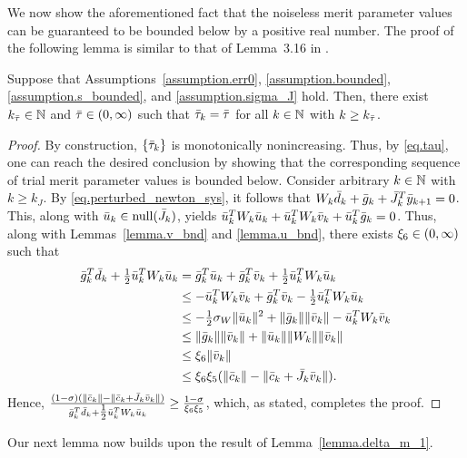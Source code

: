 We now show the aforementioned fact that the noiseless merit parameter values can be guaranteed to be bounded below by a positive real number.  The proof of the following lemma is similar to that of Lemma~3.16 in \cite{curtis2010matrix}.

\begin{lemma}\label{lemma.bounded_tau}
  Suppose that Assumptions~\ref{assumption.err0}, \ref{assumption.bounded}, \ref{assumption.s_bounded}, and \ref{assumption.sigma_J} hold.  Then, there exist $k_{\bar \tau} \in \mathbb{N}$ and ${\bar \tau} \in (0,\infty)$ such that ${\bar \tau}_k = {\bar \tau}$ for all $k \in \mathbb{N}$ with $k \geq k_{{\bar \tau}}$.
\end{lemma}
\begin{proof}
  By construction, $\{{\bar \tau}_k\}$ is monotonically nonincreasing.  Thus, by \eqref{eq.tau}, one can reach the desired conclusion by showing that the corresponding sequence of trial merit parameter values is bounded below.  Consider arbitrary $k \in \mathbb{N}$ with $k \geq k_J$.  By \eqref{eq.perturbed_newton_sys}, it follows that $W_k {\bar d}_k  + {\bar g}_k + {\bar J}_k^T {\bar y}_{k+1} = 0$.  This, along with ${\bar u}_k \in \mathrm{null}({\bar J}_k)$, yields ${\bar u}_k^T W_k {\bar u}_k + {\bar u}_k^T W_k {\bar v}_k + {\bar u}_k^T {\bar g}_k = 0$. Thus, along with Lemmas~\ref{lemma.v_bnd} and \ref{lemma.u_bnd}, there exists $\xi_6 \in (0,\infty)$ such that  
  \begin{align*}
    {\bar g}_k^T {\bar d}_k + \tfrac{1}{2} {\bar u}_k^T W_k {\bar u}_k &= {\bar g}_k^T {\bar u}_k + {\bar g}_k^T {\bar v}_k + \tfrac{1}{2} {\bar u}_k^T W_k {\bar u}_k\\
&\leq    - {\bar u}_k^T W _k {\bar v}_k  + {\bar g}_k^T {\bar v}_k - \tfrac{1}{2} {\bar u}_k^T W_k {\bar u}_k\\
    &\leq  - \tfrac{1}{2} \sigma_W \|{\bar u}_k\|^2 + \|{\bar g}_k\|\|{\bar v}_k\|  - {\bar u}_k^T W_k {\bar v}_k  \\
    & \leq  \|{\bar g}_k\|\|{\bar v}_k\| + \|{\bar u}_k\| \|W_k\|\|{\bar v}_k\| \\
    & \leq  \xi_6 \|{\bar v}_k \| \\
    & \leq  \xi_6 \xi_5 (\|{\bar c}_k\| - \|{\bar c}_k + {\bar J}_k {\bar v}_k\|).
  \end{align*}
  Hence, $\tfrac{(1 - \sigma)(\|{\bar c}_k\| - \|{\bar c}_k + {\bar J}_k {\bar v}_k\|)}{{\bar g}_k^T {\bar d}_k + \tfrac{1}{2}{\bar u}_k^T W_k {\bar u}_k} \geq \tfrac{1 - \sigma}{\xi_6 \xi_5}$, which, as stated, completes the proof.
\end{proof}

Our next lemma now builds upon the result of Lemma~\ref{lemma.delta_m_1}.

